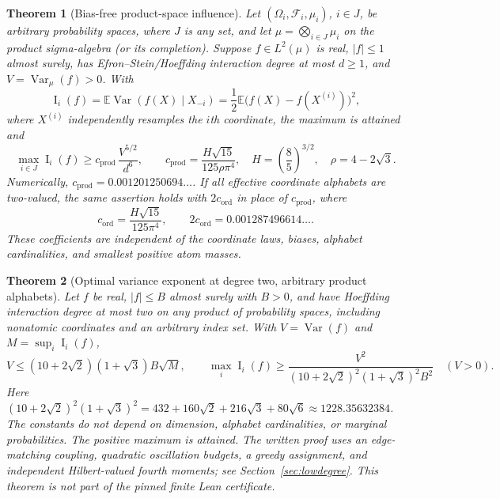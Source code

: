 \documentclass[11pt]{article}
\numberwithin{equation}{section}
\newtheorem{theorem}{Theorem}[section]
\theoremstyle{remark}
\newcommand{\E}{\mathbb E}
\newcommand{\Var}{\operatorname{Var}}
\newcommand{\Inf}{\operatorname{I}}
\newcommand{\cprod}{c_{\mathrm{prod}}}
\newcommand{\cord}{c_{\mathrm{ord}}}
\newcommand{\Dquad}{(10+2\sqrt2)(1+\sqrt3)}
\newcommand{\Kquad}{(10+2\sqrt2)^2(1+\sqrt3)^2}
\begin{document}
\begin{theorem}[Bias-free product-space influence]\label{thm:main}
Let $(\Omega_i,\mathcal F_i,\mu_i)$, $i\in J$, be arbitrary probability spaces, where $J$ is any set, and let $\mu=\bigotimes_{i\in J}\mu_i$ on the product sigma-algebra (or its completion). Suppose $f\in L^2(\mu)$ is real, $|f|\le1$ almost surely, has Efron--Stein/Hoeffding interaction degree at most $d\ge1$, and $V=\Var_\mu(f)>0$. With
\begin{equation}\label{eq:influence}
 \Inf_i(f)=\E\Var(f(X)\mid X_{-i})
 =\frac12\E\bigl(f(X)-f(X^{(i)})\bigr)^2,
\end{equation}
where $X^{(i)}$ independently resamples the $i$th coordinate, the maximum is attained and
\begin{equation}\label{eq:headline}
 \max_{i\in J}\Inf_i(f)\ge \cprod\,\frac{V^{5/2}}{d^6},\qquad
 \cprod=\frac{H\sqrt{15}}{125\rho\pi^4},\quad
 H=\left(\frac85\right)^{3/2},\quad \rho=4-2\sqrt3.
\end{equation}
Numerically, $\cprod=0.001201250694\ldots$. If all effective coordinate alphabets are two-valued, the same assertion holds with $2\cord$ in place of $\cprod$, where
\begin{equation}\label{eq:cord}
 \cord=\frac{H\sqrt{15}}{125\pi^4},\qquad 2\cord=0.001287496614\ldots.
\end{equation}
These coefficients are independent of the coordinate laws, biases, alphabet cardinalities, and smallest positive atom masses.
\end{theorem}

\begin{theorem}[Optimal variance exponent at degree two, arbitrary product alphabets]\label{thm:quadall}
Let $f$ be real, $|f|\le B$ almost surely with $B>0$, and have Hoeffding interaction degree at most two on \emph{any} product of probability spaces, including nonatomic coordinates and an arbitrary index set. With $V=\Var(f)$ and $M=\sup_i\Inf_i(f)$,
\begin{equation}\label{eq:quadall}
 V\le \Dquad B\sqrt M,\qquad
 \max_i\Inf_i(f)\ge\frac{V^2}{\Kquad B^2}\quad(V>0).
\end{equation}
Here $\Kquad=432+160\sqrt2+216\sqrt3+80\sqrt6\approx1228.35632384$. The constants do not depend on dimension, alphabet cardinalities, or marginal probabilities. The positive maximum is attained. The written proof uses an edge-matching coupling, quadratic oscillation budgets, a greedy assignment, and independent Hilbert-valued fourth moments; see Section~\ref{sec:lowdegree}. This theorem is not part of the pinned finite Lean certificate.
\end{theorem}
\end{document}
